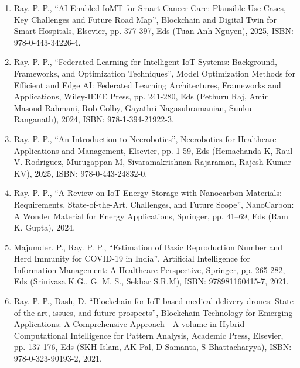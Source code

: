 \documentclass[11pt,a4paper]{moderncv}
\begin{document}
\begin{adjustwidth}{6em}{0pt}
	\begin{enumerate}
		
		\item Ray. P. P., “AI-Enabled IoMT for Smart Cancer Care: Plausible Use Cases, Key Challenges and Future Road Map”, Blockchain and Digital Twin for Smart Hospitals, Elsevier, pp. 377-397, Eds (Tuan Anh Nguyen), 2025, ISBN: 978-0-443-34226-4.
		
		\item Ray. P. P., “Federated Learning for Intelligent IoT Systems: Background, Frameworks, and Optimization Techniques”, Model Optimization Methods for Efficient and Edge AI: Federated Learning Architectures, Frameworks and Applications, Wiley-IEEE Press, pp. 241-280, Eds (Pethuru Raj, Amir Masoud Rahmani, Rob Colby, Gayathri Nagasubramanian, Sunku Ranganath), 2024, ISBN: 978-1-394-21922-3.
		
		\item Ray. P. P., “An Introduction to Necrobotics”, Necrobotics for Healthcare Applications and Management, Elsevier, pp. 1-59, Eds (Hemachanda K, Raul V. Rodriguez, Murugappan M, Sivaramakrishnan Rajaraman, Rajesh Kumar KV), 2025, ISBN: 978-0-443-24832-0.
		
		\item Ray. P. P., “A Review on IoT Energy Storage with Nanocarbon Materials: Requirements, State-of-the-Art, Challenges, and Future Scope”, NanoCarbon: A Wonder Material for Energy Applications, Springer, pp. 41–69, Eds (Ram K. Gupta), 2024.
		
		\item Majumder. P., Ray. P. P., “Estimation of Basic Reproduction Number and Herd Immunity for COVID-19 in India”, Artificial Intelligence for Information Management: A Healthcare Perspective, Springer, pp. 265-282, Eds (Srinivasa K.G., G. M. S., Sekhar S.R.M), ISBN: 978981160415-7, 2021.
		
		\item Ray. P. P., Dash, D. “Blockchain for IoT-based medical delivery drones: State of the art, issues, and future prospects”, Blockchain Technology for Emerging Applications: A Comprehensive Approach - A volume in Hybrid Computational Intelligence for Pattern Analysis, Academic Press, Elsevier, pp. 137-176, Eds (SKH Islam, AK Pal, D Samanta, S Bhattacharyya), ISBN:  978-0-323-90193-2, 2021.
		
	\end{enumerate}
\end{adjustwidth}
\end{document}
